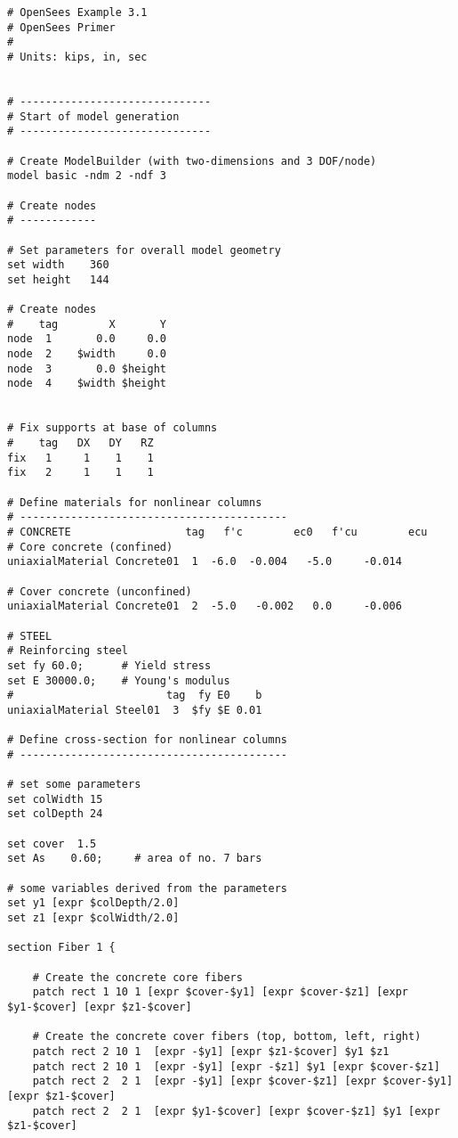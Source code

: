 \documentclass[12pt]{article}
\begin{document}
\vspace{0.2in} 
{\sf\small
\begin{verbatim}
# OpenSees Example 3.1
# OpenSees Primer
#
# Units: kips, in, sec


# ------------------------------
# Start of model generation
# ------------------------------

# Create ModelBuilder (with two-dimensions and 3 DOF/node)
model basic -ndm 2 -ndf 3

# Create nodes
# ------------

# Set parameters for overall model geometry
set width    360
set height   144

# Create nodes
#    tag        X       Y 
node  1       0.0     0.0 
node  2    $width     0.0 
node  3       0.0 $height
node  4    $width $height


# Fix supports at base of columns
#    tag   DX   DY   RZ
fix   1     1    1    1
fix   2     1    1    1

# Define materials for nonlinear columns
# ------------------------------------------
# CONCRETE                  tag   f'c        ec0   f'cu        ecu
# Core concrete (confined)
uniaxialMaterial Concrete01  1  -6.0  -0.004   -5.0     -0.014

# Cover concrete (unconfined)
uniaxialMaterial Concrete01  2  -5.0   -0.002   0.0     -0.006

# STEEL
# Reinforcing steel 
set fy 60.0;      # Yield stress
set E 30000.0;    # Young's modulus
#                        tag  fy E0    b
uniaxialMaterial Steel01  3  $fy $E 0.01

# Define cross-section for nonlinear columns
# ------------------------------------------

# set some parameters
set colWidth 15
set colDepth 24 

set cover  1.5
set As    0.60;     # area of no. 7 bars

# some variables derived from the parameters
set y1 [expr $colDepth/2.0]
set z1 [expr $colWidth/2.0]

section Fiber 1 {

    # Create the concrete core fibers
    patch rect 1 10 1 [expr $cover-$y1] [expr $cover-$z1] [expr $y1-$cover] [expr $z1-$cover]

    # Create the concrete cover fibers (top, bottom, left, right)
    patch rect 2 10 1  [expr -$y1] [expr $z1-$cover] $y1 $z1
    patch rect 2 10 1  [expr -$y1] [expr -$z1] $y1 [expr $cover-$z1]
    patch rect 2  2 1  [expr -$y1] [expr $cover-$z1] [expr $cover-$y1] [expr $z1-$cover]
    patch rect 2  2 1  [expr $y1-$cover] [expr $cover-$z1] $y1 [expr $z1-$cover]


\end{verbatim}}
\end{document}
